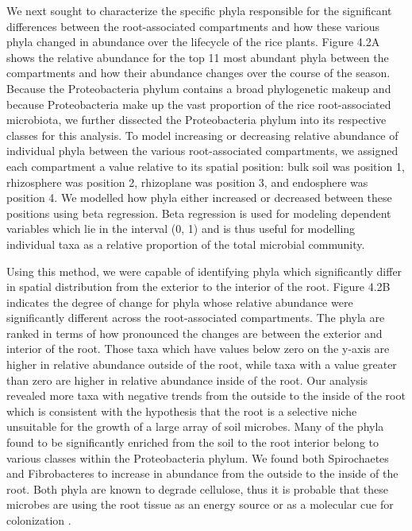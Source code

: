 We next sought to characterize the specific phyla responsible for the significant differences between the root-associated compartments and how these various phyla changed in abundance over the lifecycle of the rice plants. Figure 4.2A shows the relative abundance for the top 11 most abundant phyla between the compartments and how their abundance changes over the course of the season. Because the Proteobacteria phylum contains a broad phylogenetic makeup and because Proteobacteria make up the vast proportion of the rice root-associated microbiota, we further dissected the Proteobacteria phylum into its respective classes for this analysis. To model increasing or decreasing relative abundance of individual phyla between the various root-associated compartments, we assigned each compartment a value relative to its spatial position: bulk soil was position 1, rhizosphere was position 2, rhizoplane was position 3, and endosphere was position 4. We modelled how phyla either increased or decreased between these positions using beta regression. Beta regression is used for modeling dependent variables which lie in the interval (0, 1) and is thus useful for modelling individual taxa as a relative proportion of the total microbial community. 

Using this method, we were capable of identifying phyla which significantly differ in spatial distribution from the exterior to the interior of the root. Figure 4.2B indicates the degree of change for phyla whose relative abundance were significantly different across the root-associated compartments. The phyla are ranked in terms of how pronounced the changes are between the exterior and interior of the root. Those taxa which have values below zero on the y-axis are higher in relative abundance outside of the root, while taxa with a value greater than zero are higher in relative abundance inside of the root. Our analysis revealed more taxa with negative trends from the outside to the inside of the root which is consistent with the hypothesis that the root is a selective niche unsuitable for the growth of a large array of soil microbes. Many of the phyla found to be significantly enriched from the soil to the root interior belong to various classes within the Proteobacteria phylum. We found both Spirochaetes and Fibrobacteres to increase in abundance from the outside to the inside of the root. Both phyla are known to degrade cellulose, thus it is probable that these microbes are using the root tissue as an energy source or as a molecular cue for colonization \cite{Kudo1987,Ransom-Jones2012}.

